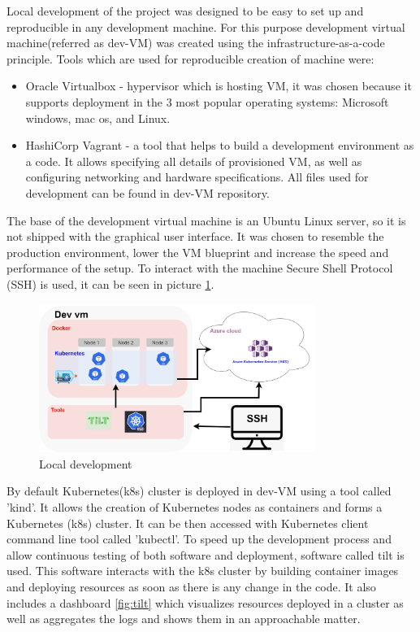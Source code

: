 Local development of the project was designed to be easy to set up and reproducible in any development machine. For this purpose development virtual machine(referred as dev-VM) was created using the infrastructure-as-a-code principle. Tools which are used for reproducible creation of machine were:
\begin{itemize}
    \item Oracle Virtualbox\cite{virtual_box} - hypervisor which is hosting VM, it was chosen because it supports deployment in the 3 most popular operating systems: Microsoft windows, mac os, and Linux.
    \item HashiCorp Vagrant\cite{vagrant} - a tool that helps to build a development environment as a code. It allows specifying all details of provisioned VM, as well as configuring networking and hardware specifications. All files used for development can be found in dev-VM repository\cite{dev_vm}.
\end{itemize}

The base of the development virtual machine is an Ubuntu Linux server, so it is not shipped with the graphical user interface. It was chosen to resemble the production environment, lower the VM blueprint and increase the speed and performance of the setup. To interact with the machine Secure Shell Protocol (SSH) is used, it can be seen in picture \ref{fig:local_development}.

\begin{figure}[H]
    \centering
    \includegraphics[width=0.8\textwidth]{pictures/development_setup.png}
    \caption{ Local development }
    \label{fig:local_development}
\end{figure}

By default Kubernetes(k8s) cluster is deployed in dev-VM using a tool called 'kind'. It allows the creation of Kubernetes nodes as containers and forms a Kubernetes (k8s) cluster. It can be then accessed with Kubernetes client command line tool called 'kubectl'. To speed up the development process and allow continuous testing of both software and deployment, software called tilt is used. This software interacts with the k8s cluster by building container images and deploying resources as soon as there is any change in the code. It also includes a dashboard \ref{fig:tilt} which visualizes resources deployed in a cluster as well as aggregates the logs and shows them in an approachable matter.


